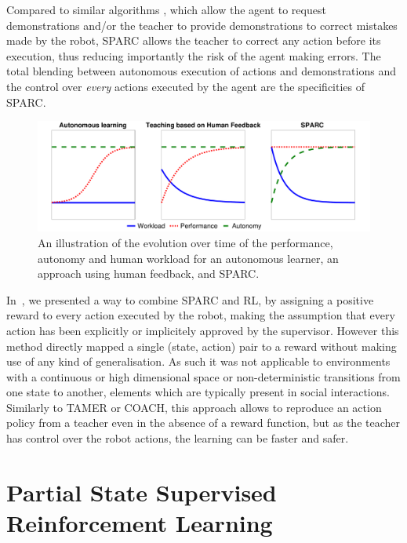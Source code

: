\documentclass[letterpaper]{article} %
\begin{document}
Compared to similar algorithms
\cite{chernova2009interactive,walsh2010generalizing}, which allow the agent to
request demonstrations and/or the teacher to provide demonstrations to correct
mistakes made by the robot, SPARC allows the teacher to correct any action
before its execution, thus reducing importantly the risk of the agent making
errors. The total blending between autonomous execution of actions and
demonstrations and the control over \emph{every} actions executed by the agent
are the specificities of SPARC.

\begin{figure}
    \centering
    \includegraphics[width=0.9\linewidth]{./figs/motivation.pdf}
    \caption{An illustration of the evolution over time of the performance,
    autonomy and human workload for an autonomous learner, an approach using
    human feedback, and SPARC.}
    \label{fig:comparison}
\end{figure}

In~\cite{senft2017supervised}, we presented a way to combine SPARC and RL, by
assigning a positive reward to every action executed by the robot, making the
assumption that every action has been explicitly or implicitely approved by the
supervisor. However this method directly mapped a single (state, action)
pair to a reward without making use of any kind of generalisation. As such it
was not applicable to environments with a continuous or high dimensional space
or non-deterministic transitions from one state to another, elements which are
typically present in social interactions. Similarly to TAMER or COACH, this
approach allows to reproduce an action policy from a teacher even in the absence
of a reward function, but as the teacher has control over the robot actions, the
learning can be faster and safer.

\section{Partial State Supervised Reinforcement Learning}
\end{document}
